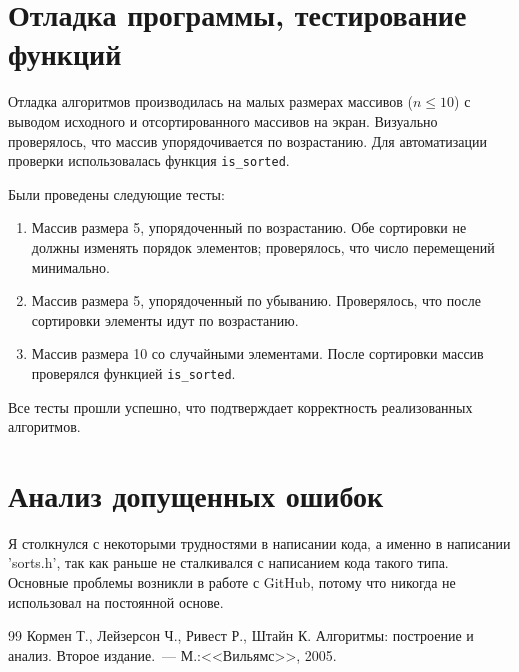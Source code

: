 \documentclass[a4paper,12pt,titlepage,finall]{article}
\begin{document}
\section{Отладка программы, тестирование функций}

Отладка алгоритмов производилась на малых размерах массивов (\(n \leq 10\)) с выводом исходного и отсортированного массивов на экран. Визуально проверялось, что массив упорядочивается по возрастанию. Для автоматизации проверки использовалась функция \texttt{is\_sorted}.

Были проведены следующие тесты:
\begin{enumerate}
    \item Массив размера 5, упорядоченный по возрастанию. Обе сортировки не должны изменять порядок элементов; проверялось, что число перемещений минимально.
    \item Массив размера 5, упорядоченный по убыванию. Проверялось, что после сортировки элементы идут по возрастанию.
    \item Массив размера 10 со случайными элементами. После сортировки массив проверялся функцией \texttt{is\_sorted}.
\end{enumerate}
Все тесты прошли успешно, что подтверждает корректность реализованных алгоритмов.

\section{Анализ допущенных ошибок}

Я столкнулся с некоторыми трудностями в написании кода, а именно в написании 'sorts.h', так как раньше не сталкивался с написанием кода такого типа. Основные проблемы возникли в работе с GitHub, потому что никогда не использовал на постоянной основе.

\begin{raggedright}
\begin{thebibliography}{99}
 Кормен Т., Лейзерсон Ч., Ривест Р., Штайн К. Алгоритмы: построение и анализ. Второе издание.~--- М.:<<Вильямс>>, 2005.
\end{thebibliography}
\end{raggedright}
\end{document}
